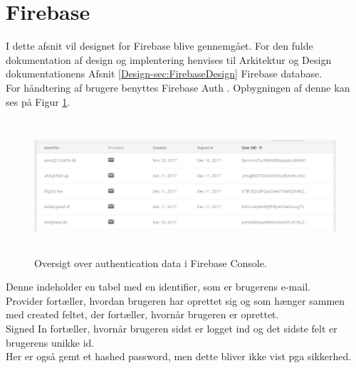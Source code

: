 \section{Firebase}
I dette afsnit vil designet for Firebase blive gennemgået. For den fulde dokumentation af design og implentering henvises til Arkitektur og Design dokumentationens Afsnit \ref{Design-sec:FirebaseDesign} Firebase database. \\

For håndtering af brugere benyttes Firebase Auth \cite{FirebaseAuth}. Opbygningen af denne kan ses på Figur \ref{fig:FirebaseAuthPNG}.

\begin{figure}[H] %
	\centering
	\includegraphics[height=5cm, width=15cm]{Design/Firebase/FirebaseAuth}
	\caption{Oversigt over authentication data i Firebase Console.}
	\label{fig:FirebaseAuthPNG}
\end{figure}
Denne indeholder en tabel med en identifier, som er brugerens e-mail. \\
Provider fortæller, hvordan brugeren har oprettet sig og som hænger sammen med created feltet, der fortæller, hvornår brugeren er oprettet. \\
Signed In fortæller, hvornår brugeren sidst er logget ind og det sidste felt er brugerens unikke id. \\
Her er også gemt et hashed password, men dette bliver ikke vist pga sikkerhed. \\

\clearpage


